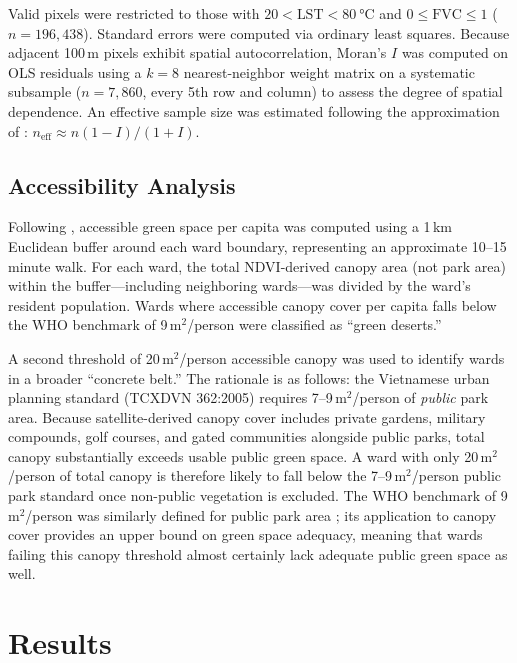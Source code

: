 \documentclass[preprint,12pt]{elsarticle}
\begin{document}
Valid pixels were restricted to those with $20 < \text{LST} < \SI{80}{\degreeCelsius}$ and $0 \leq \text{FVC} \leq 1$ ($n = 196{,}438$). Standard errors were computed via ordinary least squares. Because adjacent 100\,m pixels exhibit spatial autocorrelation, Moran's $I$ was computed on OLS residuals using a $k=8$ nearest-neighbor weight matrix on a systematic subsample ($n = 7{,}860$, every 5th row and column) to assess the degree of spatial dependence. An effective sample size was estimated following the approximation of \citet{clifford1989}: $n_{\text{eff}} \approx n(1 - I)/(1 + I)$.

\subsection{Accessibility Analysis}

Following \citet{wolch2014}, accessible green space per capita was computed using a 1\,km Euclidean buffer around each ward boundary, representing an approximate 10--15 minute walk. For each ward, the total NDVI-derived canopy area (not park area) within the buffer---including neighboring wards---was divided by the ward's resident population. Wards where accessible canopy cover per capita falls below the WHO benchmark of 9\,m$^2$/person were classified as ``green deserts.''

A second threshold of 20\,m$^2$/person accessible canopy was used to identify wards in a broader ``concrete belt.'' The rationale is as follows: the Vietnamese urban planning standard (TCXDVN 362:2005) requires 7--9\,m$^2$/person of \textit{public} park area. Because satellite-derived canopy cover includes private gardens, military compounds, golf courses, and gated communities alongside public parks, total canopy substantially exceeds usable public green space. A ward with only 20\,m$^2$/person of total canopy is therefore likely to fall below the 7--9\,m$^2$/person public park standard once non-public vegetation is excluded. The WHO benchmark of 9\,m$^2$/person was similarly defined for public park area \citep{who2016}; its application to canopy cover provides an upper bound on green space adequacy, meaning that wards failing this canopy threshold almost certainly lack adequate public green space as well.

\section{Results}
\label{sec:results}
\end{document}
